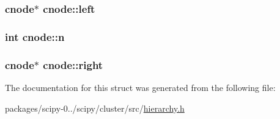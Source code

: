 \subsubsection[{left}]{ {\bf cnode}$\ast$ cnode\+::left}\label{structcnode_a45a49e46579552fb4928a4bd243d8def}
\hypertarget{structcnode_a929f2cd1e7f84abb3deac2b9e0347969}{}
\subsubsection[{n}]{\setlength{\rightskip}{0pt plus 5cm}int cnode\+::n}\label{structcnode_a929f2cd1e7f84abb3deac2b9e0347969}
\hypertarget{structcnode_a6e452d0478955a6a86f148901394cb05}{}
\subsubsection[{right}]{ {\bf cnode}$\ast$ cnode\+::right}\label{structcnode_a6e452d0478955a6a86f148901394cb05}


The documentation for this struct was generated from the following file\+:\begin{DoxyCompactItemize}
\item 
packages/scipy-\/0../scipy/cluster/src/\hyperlink{hierarchy_8h}{hierarchy.\+h}\end{DoxyCompactItemize}
